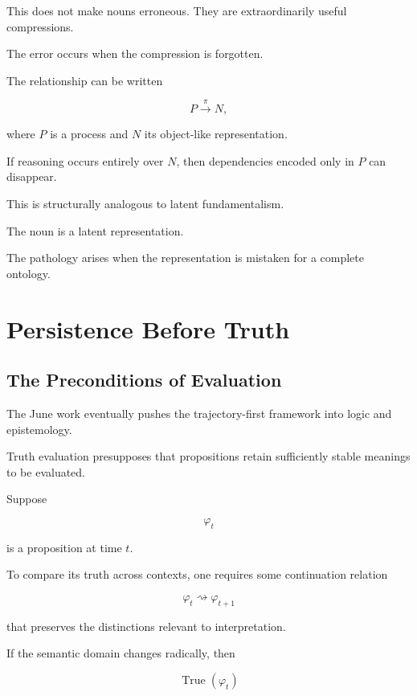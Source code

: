 \documentclass[11pt]{article}
\theoremstyle{remark}
\begin{document}
This does not make nouns erroneous. They are extraordinarily useful compressions.

The error occurs when the compression is forgotten.

The relationship can be written

\begin{equation}
P
\xrightarrow{\pi}
N,
\end{equation}

where $P$ is a process and $N$ its object-like representation.

If reasoning occurs entirely over $N$, then dependencies encoded only in $P$ can disappear.

This is structurally analogous to latent fundamentalism.

The noun is a latent representation.

The pathology arises when the representation is mistaken for a complete ontology.

\section{Persistence Before Truth}

\subsection{The Preconditions of Evaluation}

The June work eventually pushes the trajectory-first framework into logic and epistemology.

Truth evaluation presupposes that propositions retain sufficiently stable meanings to be evaluated.

Suppose

\begin{equation}
\varphi_t
\end{equation}

is a proposition at time $t$.

To compare its truth across contexts, one requires some continuation relation

\begin{equation}
\varphi_t
\rightsquigarrow
\varphi_{t+1}
\end{equation}

that preserves the distinctions relevant to interpretation.

If the semantic domain changes radically, then

\begin{equation}
\operatorname{True}(\varphi_t)
\end{equation}
\end{document}
